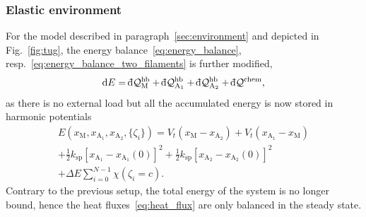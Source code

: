 \documentclass[aps,pre,twocolumn,showpacs,showkeys,superscriptaddress,floatfix]{revtex4-1}
\newcommand{\rmd}{{\mathrm d}}
\newcommand{\dbar}{{\mathchar '26 \mkern-11mu {\mathrm d}}}
\begin{document}
\subsubsection{Elastic environment}
\label{sec:power_elastic}
For the model described in paragraph~\ref{sec:environment} and depicted in Fig.~\ref{fig:tug}, 
the energy balance~\eqref{eq:energy_balance}, resp.~\eqref{eq:energy_balance_two_filaments} is further modified,
\begin{equation*}
\rmd E = \dbar {\mathcal Q}_\text{M}^\text{hb} + \dbar {\mathcal Q}_{\text{A}_1}^\text{hb} + \dbar {\mathcal Q}_{\text{A}_2}^\text{hb} + \dbar {\mathcal Q}^\text{chem}, 
\end{equation*}
as there is no external load but all the accumulated energy is now stored in harmonic potentials 
\begin{multline*}
E( x_\text{M}, x_{\text{A}_1}, x_{\text{A}_2}, \{ \zeta_i \}) 
= V_t( x_\text{M} - x_{\text{A}_2} ) 
+ V_t( x_{\text{A}_1} - x_\text{M} ) 
\\
+ \frac{1}{2} k_\text{sp} \left[ x_{\text{A}_1} - x_{\text{A}_1}(0) \right]^2 
+ \frac{1}{2} k_\text{sp} \left[ x_{\text{A}_2} - x_{\text{A}_2}(0) \right]^2 
\\
+ \Delta E \sum\limits_{i=0}^{N-1} \chi( \zeta_i = c ) .
\end{multline*}
Contrary to the previous setup, the total energy of the system is no longer bound, hence the heat fluxes~\eqref{eq:heat_flux} are only balanced in the steady state.
\end{document}
